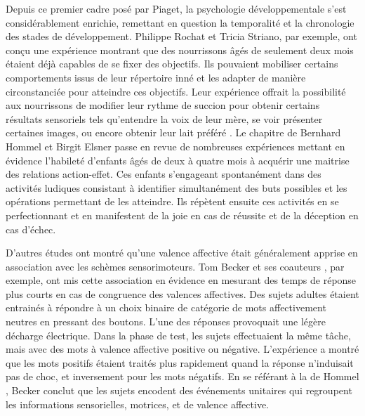 Depuis ce premier cadre posé par Piaget, la psychologie développementale s'est considérablement enrichie, remettant en question la temporalité et la chronologie des stades de développement. 
Philippe Rochat et Tricia Striano, par exemple, ont conçu une expérience montrant que des nourrissons âgés de seulement deux mois étaient déjà capables de se fixer des objectifs.
Ils pouvaient mobiliser certains comportements issus de leur répertoire inné et les adapter de manière circonstanciée pour atteindre ces objectifs.
Leur expérience offrait la possibilité aux nourrissons de modifier leur rythme de succion pour obtenir certains résultats sensoriels tels qu'entendre la voix de leur mère, se voir présenter certaines images, ou encore obtenir leur lait préféré \cite{rochat_emerging_1999}. %
Le chapitre  de Bernhard Hommel et Birgit Elsner  \cite{hommel_acquisition_2009} passe en revue de nombreuses expériences mettant en évidence l'habileté d'enfants âgés de deux à quatre mois à acquérir une maitrise des relations action-effet.
Ces enfants s'engageant spontanément dans des activités ludiques consistant à identifier simultanément des buts possibles et les opérations permettant de les atteindre.
Ils répètent ensuite ces activités en se perfectionnant et en manifestent de la joie en cas de réussite et de la déception en cas d'échec.  

D'autres études ont montré qu'une valence affective était généralement apprise en association avec les schèmes sensorimoteurs. 
Tom Becker et ses coauteurs \cite{beckers_automatic_2002}, par exemple, ont mis cette association en évidence en mesurant des temps de réponse plus courts en cas de congruence des valences affectives. 
Des sujets adultes étaient entrainés à  répondre à un choix binaire de catégorie de mots affectivement neutres en pressant des boutons. 
L'une des réponses provoquait une légère décharge électrique.
Dans la phase de test, les sujets effectuaient la même tâche, mais avec des mots à valence affective positive ou négative. 
L'expérience a montré que les mots positifs étaient traités plus rapidement quand la réponse n'induisait pas de choc, et inversement pour les mots négatifs. 
En se référant à la  de Hommel \cite{hommel_theory_2001}, Becker conclut que les sujets encodent des événements unitaires qui regroupent les informations sensorielles, motrices, et de valence affective. 


